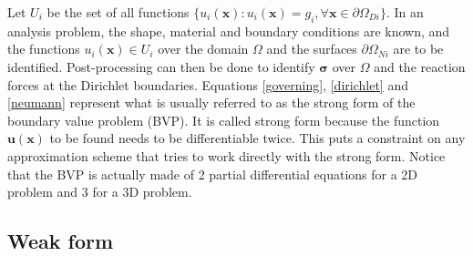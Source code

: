 	Let $U_i$ be the set of all functions $\{u_i(\bm{x}): u_i(\bm{x}) = g_i, \forall \bm{x} \in \partial\Omega_{Di} \}$. In an analysis problem, the shape, material and boundary conditions are known, and the functions $u_i(\bm{x}) \in U_i$ over the domain $\Omega$ and the surfaces $\partial \Omega_{Ni}$ are to be identified. Post-processing can then be done to identify $\bm{\sigma}$ over $\Omega$ and the reaction forces at the Dirichlet boundaries. Equations \ref{governing}, \ref{dirichlet} and \ref{neumann} represent what is usually referred to as the strong form of the boundary value problem (BVP). It is called strong form because the function $\bm{u}(\bm{x})$ to be found needs to be differentiable twice. This puts a constraint on any approximation scheme that tries to work directly with the strong form. Notice that the BVP is actually made of 2 partial differential equations for a 2D problem and 3 for a 3D problem.

\subsection{Weak form}

